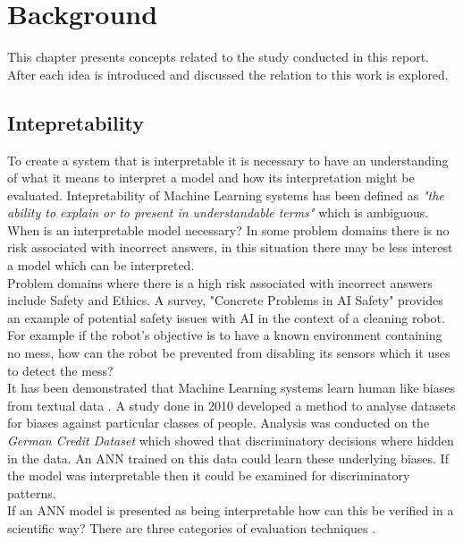 \chapter{Background}\label{C:backgroundsurvey}
This chapter presents concepts related to the study conducted in this report. After each idea is introduced and discussed the relation to this work is explored.

\section{Intepretability}
To create a system that is interpretable it is necessary to have an understanding of what it means to interpret a model and how its interpretation might be evaluated. Intepretability of Machine Learning systems has been defined as \textit{"the ability to explain or to present in understandable terms"} \cite{doshi2017towards} which is ambiguous.\\

When is an interpretable model necessary? \cite{doshi2017towards} In some problem domains there is no risk associated with incorrect answers, in this situation there may be less interest a model which can be interpreted.\\

Problem domains where there is a high risk associated with incorrect answers include Safety and Ethics. A survey, "Concrete Problems in AI Safety" \cite{amodei2016concrete} provides an example of potential safety issues with AI in the context of a cleaning robot.  For example if the robot's objective is to have a known environment containing no mess, how can the robot be prevented from disabling its sensors which it uses to detect the mess?\\

It has been demonstrated that Machine Learning systems learn human like biases from textual data \cite{caliskan2017semantics}. A study done in 2010 \cite{ruggieri2010data} developed a method to analyse datasets for biases against particular classes of people. Analysis was conducted on the \textit{German Credit Dataset} which showed that discriminatory decisions where hidden in the data. An ANN trained on this data could learn these underlying biases. If the model was interpretable then it could be examined for discriminatory patterns.\\

If an ANN model is presented as being interpretable how can this be verified in a scientific way? There are three categories of evaluation techniques \cite{doshi2017towards}.

